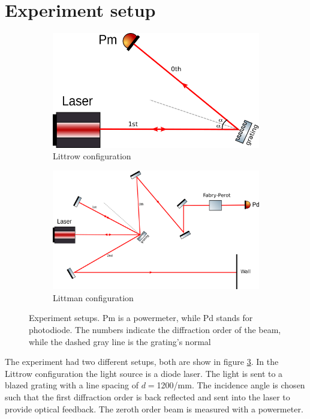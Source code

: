 \documentclass[a4paper,10pt]{article}
\begin{document}
\section{Experiment setup}
\begin{figure}[H]
    \centering
    \begin{subfigure}[b]{0.36\textwidth}
        \includegraphics[width=\textwidth]{littrow}
        \caption{Littrow configuration}\label{littrow}
    \end{subfigure}
    \hfill
    \begin{subfigure}[b]{0.62\textwidth}
        \includegraphics[width=\textwidth]{littman}
        \caption{Littman configuration}\label{littman}
    \end{subfigure}
\caption{Experiment setups. Pm is a powermeter, while Pd stands for photodiode. The numbers indicate the diffraction order of the beam, while the dashed gray line is the grating's normal}\label{setup}
\end{figure}
The experiment had two different setups, both are show in figure \ref{setup}. In the Littrow configuration the light source is a diode laser. The light is sent to a blazed grating with a line spacing of $d=$1200/mm. The incidence angle is chosen such that the first diffraction order is back reflected and sent into the laser to provide optical feedback. The zeroth order beam is measured with a powermeter.\\
\end{document}
